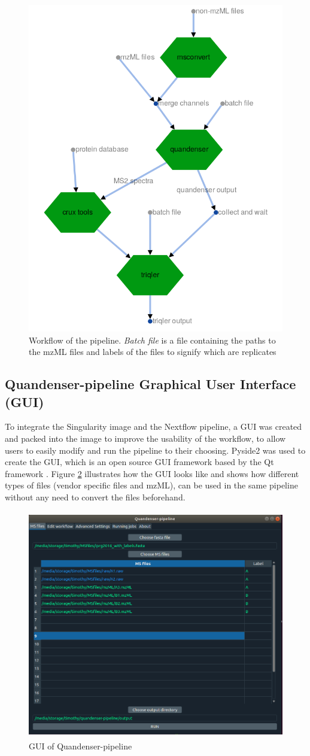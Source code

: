 \begin{figure}[H]
  \centering
  \includegraphics[width=0.5\linewidth]{pictures/workflow.png}
  \caption{Workflow of the pipeline. \textit{Batch file} is a file containing the paths to the mzML files and labels of the files to signify which are replicates}
  \label{fig:workflow}
\end{figure}

\subsection{Quandenser-pipeline Graphical User Interface (GUI)}
To integrate the Singularity image and the Nextflow pipeline, a GUI was created and packed into the image to improve the usability of the workflow, to allow users to easily modify and run the pipeline to their choosing. Pyside2 was used to create the GUI, which is an open source GUI framework based by the Qt framework \cite{pyside2}. Figure \ref{fig:GUI} illustrates how the GUI looks like and shows how different types of files (vendor specific files and mzML), can be used in the same pipeline without any need to convert the files beforehand.

\begin{figure}[H]
  \begin{center}
  \includegraphics[height=10cm]{pictures/gui.png}
  \caption{GUI of Quandenser-pipeline}
  \label{fig:GUI}
  \end{center}
\end{figure}

